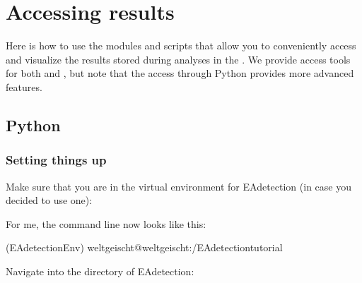\documentclass[letterpaper,10pt,english]{sphinxmanual}
\begin{document}
\chapter{Accessing results}
\label{\detokenize{access_results:accessing-results}}\label{\detokenize{access_results:access-results}}\label{\detokenize{access_results::doc}}
Here is how to use the modules and scripts that allow you to conveniently access and visualize the results stored
during analyses in the {\hyperref[\detokenize{output:resultshdf5}]{}}. We provide access tools for both {\hyperref[\detokenize{access_results:python-access}]{}} and
{\hyperref[\detokenize{access_results:matlab-access}]{}}, but note that the access through Python provides more advanced features.


\section{Python}
\label{\detokenize{access_results:python}}\label{\detokenize{access_results:python-access}}

\subsection{Setting things up}
\label{\detokenize{access_results:setting-things-up}}
Make sure that you are in the virtual environment for EAdetection (in case you decided to use one):

%
\begin{sphinxVerbatim}[commandchars=\\\{\}]
  
\end{sphinxVerbatim}

For me, the command line now looks like this:

%
\begin{sphinxVerbatim}[commandchars=\\\{\}]
(EAdetectionEnv) weltgeischt@weltgeischt:\PYGZti{}/EAdetection\PYGZus{}tutorial\PYGZdl{}
\end{sphinxVerbatim}

Navigate into the directory of EAdetection:

%
\begin{sphinxVerbatim}[commandchars=\\\{\}]
  
\end{sphinxVerbatim}
\end{document}
